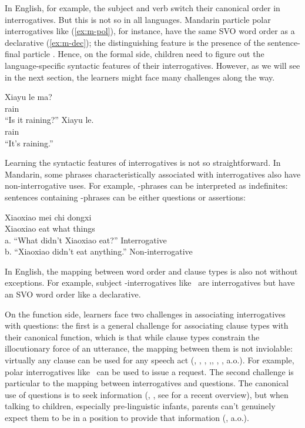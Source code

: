In English, for example, the subject and verb switch their canonical order in interrogatives. But this is not so in all languages. Mandarin particle polar interrogatives like (\ref{ex:m-pol}), for instance, have the same SVO word order as a declarative (\ref{ex:m-dec}); the distinguishing feature is the presence of the sentence-final particle . Hence, on the formal side, children need to figure out the language-specific syntactic features of their interrogatives. However, as we will see in the next section, the learners might face many challenges along the way.

\gll Xiayu	le	ma?\\
rain \Asp{} \Sfp{}\\
``Is it raining?''
\eex
{}
\gll Xiayu	le.\\
rain \Asp{}\\
``It's raining.''
\eex

Learning the syntactic features of interrogatives is not so straightforward. In Mandarin, some phrases characteristically associated with interrogatives also have non-interrogative uses. For example, \twh-phrases can be interpreted as indefinites: sentences containing \twh-phrases can be either questions or assertions:

\gll Xiaoxiao mei 	chi 	 dongxi\\ 
Xiaoxiao \Neg{} 	eat	what	things\\
a.	``What didn’t Xiaoxiao eat?''	\hfill Interrogative \twh\\
b.	``Xiaoxiao didn’t eat anything.''		\hfill Non-interrogative \twh
\eex

In English, the mapping between word order and clause types is also not without exceptions. For example, subject \twh-interrogatives like ~are interrogatives but have an SVO word order like a declarative. 

On the function side, learners face two challenges in associating interrogatives with questions: the first is a general challenge for associating clause types with their canonical function, which is that while clause types constrain the illocutionary force of an utterance, the mapping between them is not inviolable: virtually any clause can be used for any speech act (\citealt{searle1975tax}, \citealt{searle1976class}, \citealt{bachharnish1979}, \citealt{levinson1983},\citealt{searlevanderveken1985}, \citealt{portner2018}, \citealt{starr2014}, \citealt{murraystarr2020} a.o.). For example, polar interrogatives like ~can be used to issue a request. The second challenge is particular to the mapping between interrogatives and questions. The canonical use of questions is to seek information (\citealt{searle1975tax}, \citealt{levinson1983}, see \citealt{krifka2011q} for a recent overview), but when talking to children, especially pre-linguistic infants, parents can’t genuinely expect them to be in a position to provide that information (\citealt{holzman1972, shatz1978comprehension, tamir1980, yu2019pedagogical}, a.o.). %

